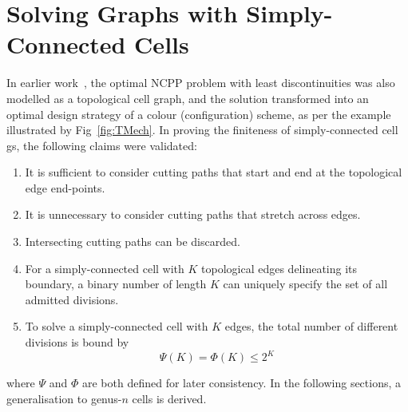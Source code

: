 \documentclass[conference]{IEEEtran}
\begin{document}


\section{Solving Graphs with Simply-Connected Cells}
\label{section_simply_connected}
In earlier work~\cite{Yang2020Cellular_arxiv}, the optimal NCPP problem with least discontinuities was also modelled as a 
topological cell graph, and the solution transformed into an optimal design strategy of a colour (configuration) scheme, as per the example 
illustrated by Fig~\ref{fig:TMech}. In proving the finiteness of simply-connected cell gs, the following claims were validated:
\begin{enumerate}
\item It is sufficient to consider cutting paths that start and end at the topological edge end-points. 
\item It is unnecessary to consider cutting paths that stretch across edges.
\item Intersecting cutting paths can be discarded. 
\item For a simply-connected cell with $K$ topological edges delineating its boundary, a binary number of length $K$ 
can uniquely specify the set of all admitted divisions. 
\item To solve a simply-connected cell with $K$ edges, the total number of different divisions is bound by %
\begin{equation}
\label{equ_Psi}
\Psi(K) = \Phi(K) \leq 2^K
\end{equation}
\end{enumerate}
where $\Psi$ and $\Phi$ are both defined for later consistency.  
In the following sections, a generalisation to genus-$n$ cells is derived.
\end{document}
